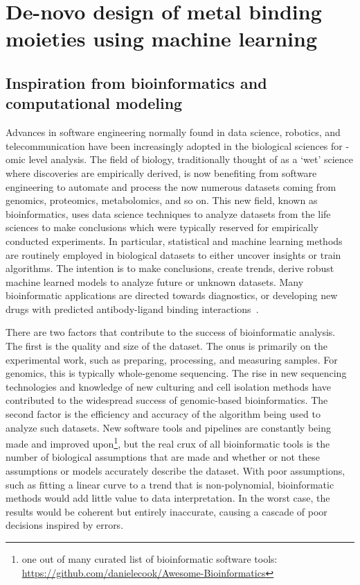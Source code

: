 \documentclass[../main/main]{subfiles}
\begin{document}
\chapter{De-novo design of metal binding moieties using machine learning}
\label{appendixC}
\newcommand{\mPDB}{\textit{m}PDB}

\section{Inspiration from bioinformatics and computational modeling}
Advances in software engineering normally found in data science, robotics, and telecommunication have been increasingly adopted in the biological sciences for -omic level analysis. The field of biology, traditionally thought of as a `wet' science where discoveries are empirically derived, is now benefiting from software engineering to automate and process the now numerous datasets coming from genomics, proteomics, metabolomics, and so on. This new field, known as bioinformatics, uses data science techniques to analyze datasets from the life sciences to make conclusions which were typically reserved for empirically conducted experiments. In particular, statistical and machine learning methods are routinely employed in biological datasets to either uncover insights or train algorithms. The intention is to make conclusions, create trends, derive robust machine learned models to analyze future or unknown datasets. Many bioinformatic applications are directed towards diagnostics, or developing new drugs with predicted antibody-ligand binding interactions~\cite{larranaga2006machine}.

There are two factors that contribute to the success of bioinformatic analysis. The first is the quality and size of the dataset. The onus is primarily on the experimental work, such as preparing, processing, and measuring samples. For genomics, this is typically whole-genome sequencing. The rise in new sequencing technologies and knowledge of new culturing and cell isolation methods have contributed to the widespread success of genomic-based bioinformatics. The second factor is the efficiency and accuracy of the algorithm being used to analyze such datasets. New software tools and pipelines are constantly being made and improved upon\footnote{
	one out of many curated list of bioinformatic software tools: \url{https://github.com/danielecook/Awesome-Bioinformatics}
}, but the real crux of all bioinformatic tools is the number of biological assumptions that are made and whether or not these assumptions or models accurately describe the dataset. With poor assumptions, such as fitting a linear curve to a trend that is non-polynomial, bioinformatic methods would add little value to data interpretation. In the worst case, the results would be coherent but entirely inaccurate, causing a cascade of poor decisions inspired by errors.
\end{document}
